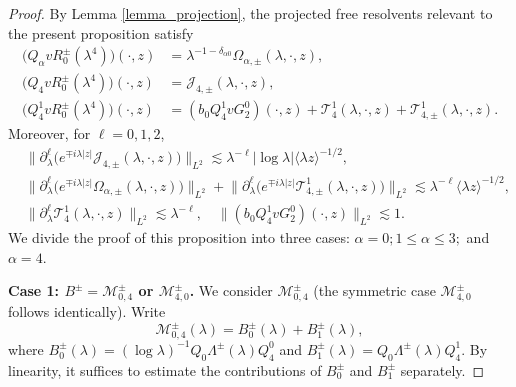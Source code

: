 \documentclass[10pt,a4paper]{amsart}
\newtheorem{comment}{Comment}
\begin{document}
\begin{proof}
	By Lemma \ref{lemma_projection}, the projected free resolvents relevant
	to the present proposition satisfy
	\begin{align}
		\bigl(Q_\alpha vR_0^\pm(\lambda^4)\bigr)(\cdot,z)
		&=
		\lambda^{-1-\delta_{\alpha0}}
		\Omega_{\alpha,\pm}(\lambda,\cdot,z),
		\label{Qalpha}\\
		\bigl(Q_4vR_0^\pm(\lambda^4)\bigr)(\cdot,z)
		&=
		\mathcal{J}_{4,\pm}(\lambda,\cdot,z),
		\label{De all Q}\\
		\bigl(Q_4^1vR_0^\pm(\lambda^4)\bigr)(\cdot,z)
		&=
		(b_0Q_4^1vG_2^0)(\cdot,z)
		+
		\mathcal{T}_4^1(\lambda,\cdot,z)
		+
		\mathcal{T}_{4,\pm}^1(\lambda,\cdot,z).
		\label{eq:resolvent_decomp-Q4}
	\end{align}
	Moreover, for $\ell=0,1,2$,
	\begin{equation}
		\begin{split}
			&	\big\|
			\partial_\lambda^\ell
			\bigl(
			e^{\mp i\lambda|z|}
			\mathcal{J}_{4,\pm}(\lambda,\cdot,z)
			\bigr) 
			\big\|_{L^2} \lesssim 
			\lambda^{-\ell} 	|\log\lambda|
			\langle\lambda z\rangle^{-1/2},\\
		&
		\big\|
		\partial_\lambda^\ell
		\bigl(
		e^{\mp i\lambda|z|}
		\Omega_{\alpha,\pm}(\lambda,\cdot,z)
		\bigr)
		\big\|_{L^2}
		+
		\big\|
		\partial_\lambda^\ell
		\bigl(
		e^{\mp i\lambda|z|}
		\mathcal{T}_{4,\pm}^1(\lambda,\cdot,z)
		\bigr)
		\big\|_{L^2}
		\lesssim
		\lambda^{-\ell}
		\langle\lambda z\rangle^{-1/2},\\
	&	\|
		\partial_\lambda^\ell
		\mathcal{T}_4^1(\lambda,\cdot,z)
		\|_{L^2}
		\lesssim
		\lambda^{-\ell},\quad 	\|(b_0Q_4^1vG_2^0)(\cdot,z)\|_{L^2}
		\lesssim1.
		\label{eq:E_bound-1}
		\end{split}
	\end{equation}
	We divide the proof of this proposition into three cases: $\alpha=0; 1\leq\alpha\leq3;$ and $\alpha=4.$

	\medskip
	
	
	\textbf{Case 1: $B^\pm=\mathcal{M}_{0,4}^\pm$ or
		$\mathcal{M}_{4,0}^\pm$.}
	We consider $\mathcal{M}_{0,4}^\pm$  (the symmetric case $\mathcal{M}_{4,0}^{\pm}$ follows identically). Write
	$$
	\mathcal{M}_{0,4}^\pm(\lambda)
	=
	B_0^\pm(\lambda)+B_1^\pm(\lambda),
	$$
	where
	$
	B_0^\pm(\lambda)
	=
	(\log\lambda)^{-1}
	Q_0\Lambda^\pm(\lambda)Q_4^0$
	and $
	B_1^\pm(\lambda)
	=
	Q_0\Lambda^\pm(\lambda)Q_4^1.
	$ 	By linearity, it suffices to estimate the contributions of
	$B_0^\pm$ and $B_1^\pm$ separately.
	

\end{proof}
\end{document}
